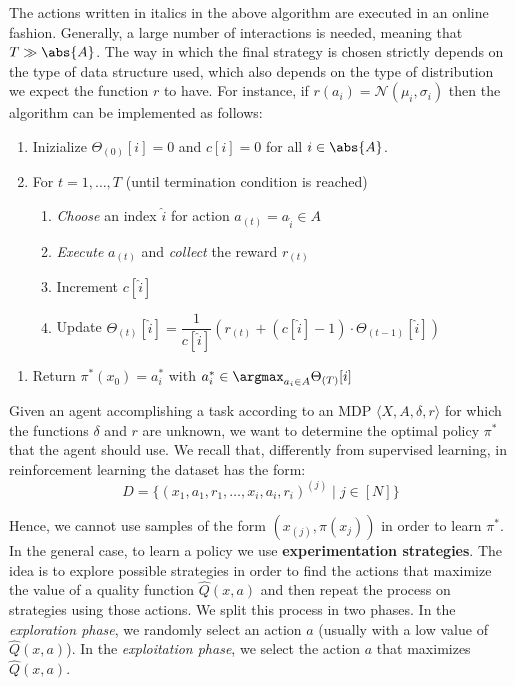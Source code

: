\documentclass[a4paper, 12pt]{report}
\begin{document}
    The actions written in italics in the above algorithm are executed in an online fashion. Generally, a large number of interactions is needed, meaning that $T \gg \abs{A}$. The way in which the final strategy is chosen strictly depends on the type of data structure used, which also depends on the type of distribution we expect the function $r$ to have. For instance, if $r(a_i) = \mathcal{N}(\mu_i, \sigma_i)$ then the algorithm can be implemented as follows:

    \begin{enumerate}
        \item Inizialize $\Theta_{(0)}[i] = 0$ and $c[i] = 0$ for all $i \in \abs{A}$.
        \item For $t = 1, \ldots, T$ (until termination condition is reached)
        \begin{enumerate}[label={\arabic*.}, start=3]
            \item \textit{Choose} an index $\widehat{i}$ for action $a_{(t)} = a_{\widehat{i}} \in A$
            \item \textit{Execute} $a_{(t)}$ and \textit{collect} the reward $r_{(t)}$
            \item Increment $c[\widehat{i}]$
            \item Update $\Theta_{(t)}[\widehat{i}] = \dfrac{1}{c[\widehat{i}]} (r_{(t)} + (c[\widehat{i}] - 1) \cdot \Theta_{(t-1)}[\widehat{i}])$ 
        \end{enumerate}
    \end{enumerate}
    \begin{enumerate}[label={\arabic*.}, start=6]
        \item Return $\pi^*(x_0) = a_i^*$ with $a_i^* \in \argmax_{a_i \in A} \Theta_{(T)}[i]$
    \end{enumerate}
    
    Given an agent accomplishing a task according to an MDP $⟨X, A, \delta,r⟩$ for which the functions $\delta$ and $r$ are unknown, we want to determine the optimal policy $\pi^*$ that the agent should use. We recall that, differently from supervised learning, in reinforcement learning the dataset has the form:
    \[D = \{ (x_1,a_1,r_1, \ldots, x_i, a_i, r_i)^{(j)} \mid j \in [N]\}\]
    
    Hence, we cannot use samples of the form $(x_{(j)}, \pi(x_{j}))$ in order to learn $\pi^*$. In the general case, to learn a policy we use \textbf{experimentation strategies}. The idea is to explore possible strategies in order to find the actions that maximize the value of a quality function $\widehat{Q}(x,a)$ and then repeat the process on strategies using those actions. We split this process in two phases. In the \textit{exploration phase}, we randomly select an action $a$ (usually with a low value of $\widehat{Q}(x,a)$). In the \textit{exploitation phase}, we select the action $a$ that maximizes $\widehat{Q}(x,a)$.
\end{document}

